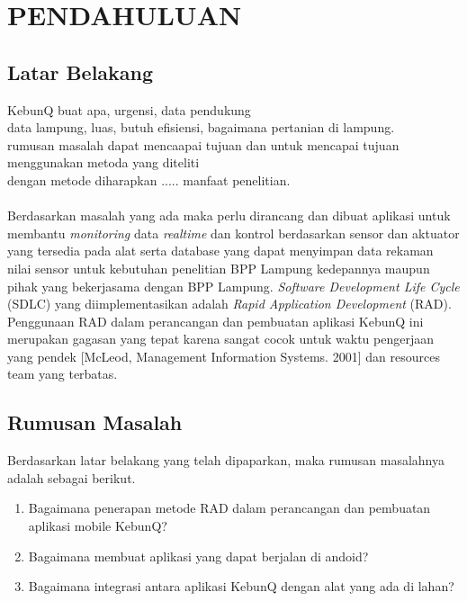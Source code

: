 \chapter{PENDAHULUAN}

\vspace{4.5pt}

\begin{flushleft}
    \section{Latar Belakang} 

\begin{justify}
  \noindent 
  
  KebunQ buat apa, urgensi, data pendukung\\
  data lampung, luas, butuh efisiensi, bagaimana pertanian di lampung.\\
  rumusan masalah dapat mencaapai tujuan dan untuk mencapai tujuan menggunakan metoda yang diteliti\\
  dengan metode diharapkan ..... manfaat penelitian.
  \\
  \\
  Berdasarkan masalah yang ada maka perlu dirancang dan dibuat aplikasi untuk membantu
\textit{monitoring} data \textit{realtime} dan kontrol berdasarkan sensor dan aktuator yang tersedia pada alat serta database yang dapat menyimpan data rekaman nilai sensor untuk kebutuhan
penelitian BPP Lampung kedepannya maupun pihak yang bekerjasama dengan BPP Lampung. \textit{Software Development Life Cycle} (SDLC) yang diimplementasikan adalah
\textit{Rapid Application Development} (RAD). Penggunaan RAD dalam perancangan dan pembuatan aplikasi KebunQ ini merupakan gagasan yang tepat karena sangat cocok untuk 
waktu pengerjaan yang pendek [McLeod, Management Information Systems. 2001] dan resources team yang terbatas.

\end{justify}
\vspace{1cm}   

\section{Rumusan Masalah}
\begin{justify}
  Berdasarkan latar belakang yang telah dipaparkan, maka rumusan masalahnya adalah sebagai berikut.
\end{justify}
\begin{enumerate}
  \item Bagaimana penerapan metode RAD dalam perancangan dan pembuatan aplikasi mobile KebunQ?
  \item Bagaimana membuat aplikasi yang dapat berjalan di andoid?
  \item Bagaimana integrasi antara aplikasi KebunQ dengan alat yang ada di lahan?
  

\end{enumerate}
\end{flushleft}

